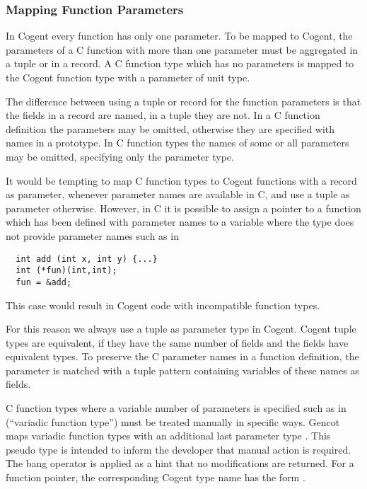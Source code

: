 \subsubsection{Mapping Function Parameters}

In Cogent every function
has only one parameter. To be mapped to Cogent, the parameters of a C function with more than one parameter must
be aggregated in a tuple or in a record. A C function type  which has no parameters is mapped
to the Cogent function type  with a parameter of unit type.

The difference between using a tuple or record for the function parameters is that the fields in a 
record are named, in a tuple they are not. In 
a C function definition the parameters may be omitted, otherwise they are specified with names in a prototype.
In C function types the names of some or all parameters may be omitted, specifying only the parameter type.

It would be tempting to map C function types to Cogent functions with a record as parameter, whenever parameter 
names are available in C, and use a tuple as parameter otherwise. However, in C it is possible to assign a 
pointer to a function which has been defined 
with parameter names to a variable where the type does not provide parameter names such as in 
\begin{verbatim}
  int add (int x, int y) {...}
  int (*fun)(int,int);
  fun = &add;
\end{verbatim}
This case would result in Cogent code with incompatible function types.

For this reason we always use a tuple as parameter type in Cogent. Cogent tuple types are equivalent, if they
have the same number of fields and the fields have equivalent types. To preserve the C parameter names in 
a function definition, the parameter is matched with a tuple pattern containing variables of these
names as fields.

C function types where a variable number of
parameters is specified such as in  (``variadic function type'') must 
be treated manually in specific ways. Gencot maps variadic function types
with an additional last parameter type . This pseudo type is intended 
to inform the developer that manual action is required. The bang operator is applied as a hint
that no modifications are returned. For a function pointer, the corresponding Cogent type name has
the form .

